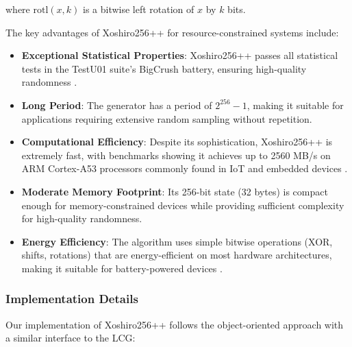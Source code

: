 where $\text{rotl}(x, k)$ is a bitwise left rotation of $x$ by $k$ bits.

The key advantages of Xoshiro256++ for resource-constrained systems include:

\begin{itemize}
    \item \textbf{Exceptional Statistical Properties}: Xoshiro256++ passes all statistical tests in the TestU01 suite's BigCrush battery, ensuring high-quality randomness \cite{blackman2019, xoshiro_website}.
    
    \item \textbf{Long Period}: The generator has a period of $2^{256} - 1$, making it suitable for applications requiring extensive random sampling without repetition.
    
    \item \textbf{Computational Efficiency}: Despite its sophistication, Xoshiro256++ is extremely fast, with benchmarks showing it achieves up to 2560 MB/s on ARM Cortex-A53 processors commonly found in IoT and embedded devices \cite{xoshiro_website}.
    
    \item \textbf{Moderate Memory Footprint}: Its 256-bit state (32 bytes) is compact enough for memory-constrained devices while providing sufficient complexity for high-quality randomness.
    
    \item \textbf{Energy Efficiency}: The algorithm uses simple bitwise operations (XOR, shifts, rotations) that are energy-efficient on most hardware architectures, making it suitable for battery-powered devices \cite{prng_iot}.
\end{itemize}

\subsubsection{Implementation Details}

Our implementation of Xoshiro256++ follows the object-oriented approach with a similar interface to the LCG:

